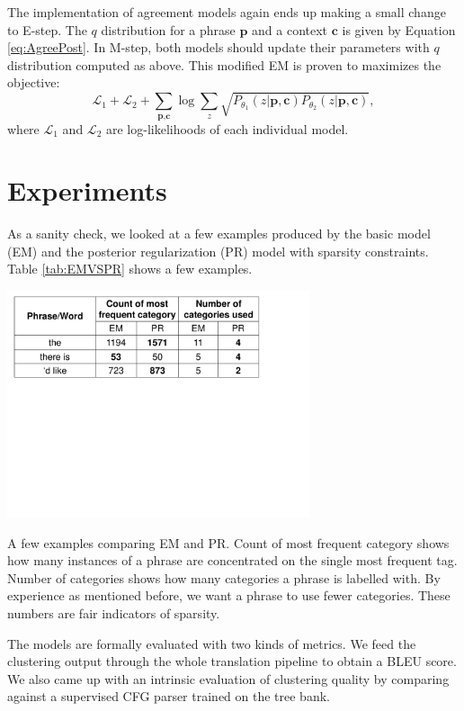 The implementation of agreement models again ends up making
a small change to E-step. The $q$ distribution for
a phrase $\textbf{p}$ and a context $\textbf{c}$ 
is given by Equation \ref{eq:AgreePost}.
In M-step, both models should update their parameters with $q$ distribution computed as above.
This modified EM is proven to
maximizes the objective:
\[
\mathcal{L}_1+
\mathcal{L}_2+
\sum_{\textbf{p},\textbf{c}}
\log\sum_z\sqrt{P_{\theta_1}(z|\textbf{p},\textbf{c})
P_{\theta_2}(z|\textbf{p},\textbf{c})},
\]
where $\mathcal{L}_1$ and $\mathcal{L}_2$
are log-likelihoods of
each individual model.
\section{Experiments}
As a sanity check, we looked at a few examples produced by
the basic model (EM) 
and the posterior regularization (PR) model
with sparsity constraints. Table \ref{tab:EMVSPR}
shows a few examples.

\begin{table}[h]
  \centering
  \includegraphics[width=3.5in]{pr-clustering/EMVSPR}
  \caption[A few examples comparing EM and PR]
  {A few examples comparing EM and PR. 
    Count of most frequent category shows how 
    many instances of a phrase are concentrated on 
    the single most frequent tag. 
    Number of categories shows how many categories
    a phrase is labelled with. By experience as mentioned before, 
    we want a phrase to use fewer categories. 
	These numbers are fair indicators of sparsity.
    }
  \label{tab:EMVSPR}
\end{table}

The models are formally evaluated with two kinds
of metrics. We feed the clustering output
through the whole translation pipeline 
to obtain a BLEU score. We also came up 
with an intrinsic evaluation of clustering quality
by comparing against a supervised CFG parser trained on the
tree bank.

